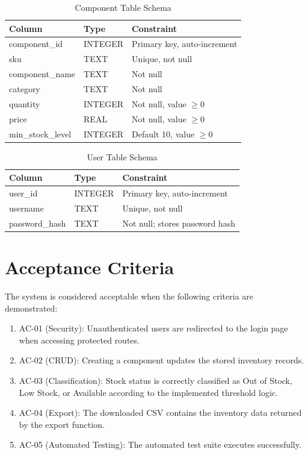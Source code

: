 \documentclass[conference]{IEEEtran}
\begin{document}
\begin{table}[!t]
\caption{Component Table Schema}
\label{tab:schema}
\centering
\small
\begin{tabularx}{\columnwidth}{l l Y}
\toprule
\textbf{Column} & \textbf{Type} & \textbf{Constraint}\\
\midrule
component\_id & INTEGER & Primary key, auto-increment\\
sku & TEXT & Unique, not null\\
component\_name & TEXT & Not null\\
category & TEXT & Not null\\
quantity & INTEGER & Not null, value $\geq 0$\\
price & REAL & Not null, value $\geq 0$\\
min\_stock\_level & INTEGER & Default 10, value $\geq 0$\\
\bottomrule
\end{tabularx}
\end{table}

\begin{table}[!t]
\caption{User Table Schema}
\label{tab:user-schema}
\centering
\small
\begin{tabularx}{\columnwidth}{l l Y}
\toprule
\textbf{Column} & \textbf{Type} & \textbf{Constraint}\\
\midrule
user\_id & INTEGER & Primary key, auto-increment\\
username & TEXT & Unique, not null\\
password\_hash & TEXT & Not null; stores password hash\\
\bottomrule
\end{tabularx}
\end{table}

\section{Acceptance Criteria}

The system is considered acceptable when the following criteria are demonstrated:

\begin{enumerate}
\item AC-01 (Security): Unauthenticated users are redirected to the login page when accessing protected routes.
\item AC-02 (CRUD): Creating a component updates the stored inventory records.
\item AC-03 (Classification): Stock status is correctly classified as Out of Stock, Low Stock, or Available according to the implemented threshold logic.
\item AC-04 (Export): The downloaded CSV contains the inventory data returned by the export function.
\item AC-05 (Automated Testing): The automated test suite executes successfully.
\end{enumerate}
\end{document}
